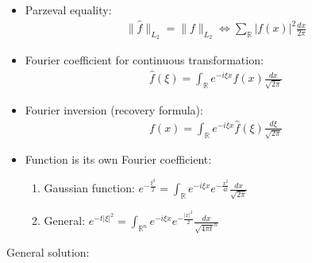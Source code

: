 \documentclass[12pt, a4paper]{article}
\begin{document}
\begin{itemize}
    \item Parzeval equality:
    \begin{gather*}
        \|\hat{f}\|_{L_2} = \|f\|_{L_2} \Leftrightarrow \sum_{\mathbb{R}}|f(x)|^2\frac{dx}{2\pi}
    \end{gather*}
    \item Fourier coefficient for continuous transformation:
    \begin{gather*}
        \hat{f}(\xi) = \int_{\mathbb{R}}e^{-i\xi x}f(x) \frac{dx}{\sqrt{2\pi}}
    \end{gather*}
    \item Fourier inversion (recovery formula):
    \begin{gather*}
        {f}(x) = \int_{\mathbb{R}}e^{-i\xi x}\hat{f}(\xi) \frac{d \xi}{\sqrt{2\pi}}
    \end{gather*}
    \item Function is its own Fourier coefficient:
    \begin{enumerate}
        \item Gaussian function: $e^{-\frac{\xi^2}{2}} = \int_{\mathbb{R}}e^{-i\xi x}e^{-\frac{x^2}{4t}}\frac{dx}{\sqrt{2\pi}}$\\
        \item General: $e^{-t|\xi|^2} = \int_{\mathbb{R}^n}e^{-i\xi x}e^{-\frac{|x|^2}{2}}\frac{dx}{\sqrt{4\pi t}^n}$
    \end{enumerate}
\end{itemize}
General solution:
\end{document}
